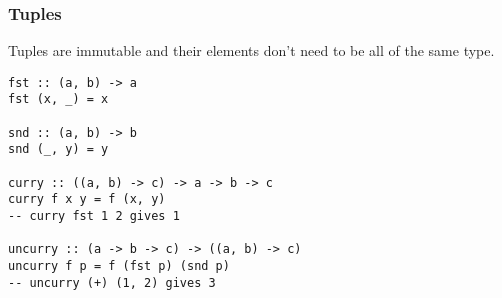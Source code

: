 %

\subsubsection{Tuples}
Tuples are immutable and their elements don't need to be all of the same type.

\begin{verbatim}
fst :: (a, b) -> a
fst (x, _) = x

snd :: (a, b) -> b
snd (_, y) = y

curry :: ((a, b) -> c) -> a -> b -> c
curry f x y = f (x, y)
-- curry fst 1 2 gives 1

uncurry :: (a -> b -> c) -> ((a, b) -> c)
uncurry f p = f (fst p) (snd p)
-- uncurry (+) (1, 2) gives 3
\end{verbatim}

%
